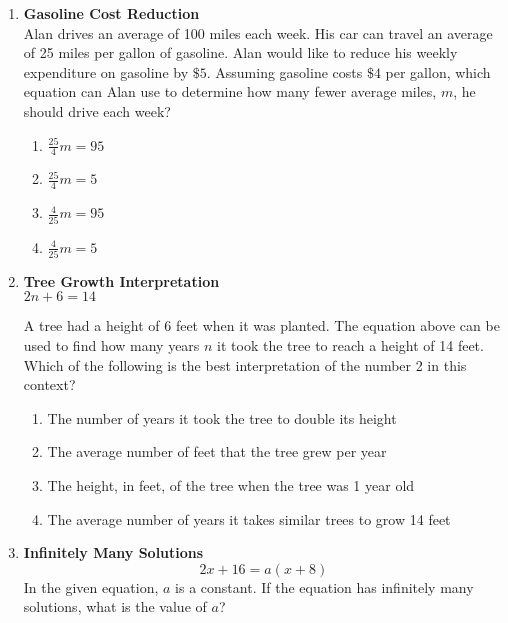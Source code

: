 \begin{enumerate}
\item \textbf{Gasoline Cost Reduction}\\
Alan drives an average of 100 miles each week. His car can travel an average of 25 miles per gallon of gasoline. Alan would like to reduce his weekly expenditure on gasoline by $\$ 5$. Assuming gasoline costs $\$ 4$ per gallon, which equation can Alan use to determine how many fewer average miles, $m$, he should drive each week?
\begin{enumerate}[label=(\Alph*)]
  \item $\frac{25}{4}m = 95$
  \item $\frac{25}{4}m = 5$
  \item $\frac{4}{25}m = 95$
  \item $\frac{4}{25}m = 5$
\end{enumerate}
\begin{subanswer}
\end{subanswer}

\item \textbf{Tree Growth Interpretation}\\
$2n + 6 = 14$

A tree had a height of 6 feet when it was planted. The equation above can be used to find how many years $n$ it took the tree to reach a height of 14 feet. Which of the following is the best interpretation of the number 2 in this context?
\begin{enumerate}[label=(\Alph*)]
  \item The number of years it took the tree to double its height
  \item The average number of feet that the tree grew per year
  \item The height, in feet, of the tree when the tree was 1 year old
  \item The average number of years it takes similar trees to grow 14 feet
\end{enumerate}
\begin{subanswer}
\end{subanswer}

\item \textbf{Infinitely Many Solutions}\\
$$
2x + 16 = a(x + 8)
$$
In the given equation, $a$ is a constant. If the equation has infinitely many solutions, what is the value of $a$?
\begin{subanswer}
\end{subanswer}


\end{enumerate}
